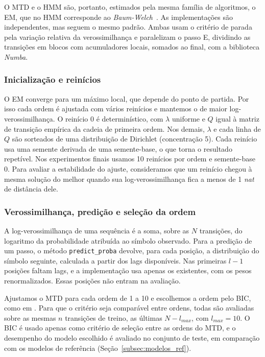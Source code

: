 \documentclass[
    12pt,                %
    openright,           %
    oneside,             %
    a4paper,             %
    english,             %
    brazil               %
]{abntex2}
\begin{document}
O MTD e o HMM são, portanto, estimados pela mesma família de algoritmos, o EM, que no HMM corresponde ao \textit{Baum-Welch}~\cite{Rabiner1989}. As implementações são
independentes, mas seguem o mesmo padrão. Ambas usam o critério de parada pela variação relativa da verossimilhança e paralelizam o passo E, dividindo as transições
em blocos com acumuladores locais, somados ao final, com a biblioteca \textit{Numba}.

\subsubsection{Inicialização e reinícios}

O EM converge para um máximo local, que depende do ponto de partida. Por isso cada ordem é ajustada com vários reinícios e mantemos o de maior
log-verossimilhança. O reinício 0 é determinístico, com $\lambda$ uniforme e $Q$ igual à matriz de transição empírica da cadeia de primeira ordem. Nos demais, $\lambda$
e cada linha de $Q$ são sorteados de uma distribuição de Dirichlet (concentração 5). Cada reinício usa uma semente derivada de uma semente-base, o que torna o
resultado repetível. Nos experimentos finais usamos 10 reinícios por ordem e semente-base 0. Para avaliar a estabilidade do ajuste, consideramos que um reinício
chegou à mesma solução do melhor quando sua log-verossimilhança fica a menos de 1 \textit{nat} de distância dele.

\subsubsection{Verossimilhança, predição e seleção da ordem}

A log-verossimilhança de uma sequência é a soma, sobre as $N$ transições, do logaritmo da probabilidade atribuída ao símbolo observado. Para a predição de um passo,
o método \texttt{predict\_proba} devolve, para cada posição, a distribuição do símbolo seguinte, calculada a partir dos lags disponíveis. Nas primeiras $l - 1$ posições faltam
lags, e a implementação usa apenas os existentes, com os pesos renormalizados. Essas posições não entram na avaliação.

Ajustamos o MTD para cada ordem de 1 a 10 e escolhemos a ordem pelo BIC, como em . Para que o critério seja comparável entre ordens, todas são avaliadas sobre
as mesmas $n$ transições de treino, as últimas $N - l_{max}$, com $l_{max} = 10$. O BIC é usado apenas como critério de seleção entre as ordens do MTD, e o desempenho do modelo
escolhido é avaliado no conjunto de teste, em comparação com os modelos de referência (Seção~\ref{subsec:modelos_ref}).
\end{document}
